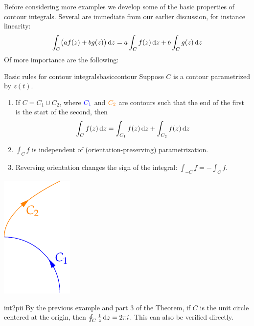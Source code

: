 Before considering more examples we develop some of the basic properties of contour integrals. Several are immediate from our earlier discussion, for instance linearity:
\[\int_C\bigl(af(z)+bg(z)\bigr)\,{\mathrm{d} z}=a\int_Cf(z)\,{\mathrm{d} z}+b\int_Cg(z)\,{\mathrm{d} z}\]
Of more importance are the following:

\begin{thm}{Basic rules for contour integrals}{basiccontour}
Suppose $C$ is a contour parametrized by $z(t)$.\par
\begin{minipage}[t]{0.75\linewidth}\vspace{-5pt}
\begin{enumerate}
  \item If $C=C_1\cup C_2$, where $\textcolor{blue}{C_1}$ and $\textcolor{orange}{C_2}$ are contours such that the end of the first is the start of the second, then
  \[\int_Cf(z)\,{\mathrm{d} z}=\int_{C_1}f(z)\,{\mathrm{d} z}+\int_{C_2}f(z)\,{\mathrm{d} z}\]
  \item $\int_Cf$ is independent of (orientation-preserving) parametrization.
  \item Reversing orientation changes the sign of the integral: $\int_{-C}f=-\int_Cf$.
\end{enumerate}
\end{minipage}\begin{minipage}[t]{0.25\linewidth}\vspace{-5pt}
\flushright\includegraphics{contours-ex5}
\end{minipage}
\end{thm}


\begin{example}{}{int2pii}
By the previous example and part 3 of the Theorem, if $C$ is the unit circle centered at the origin, then $\oint_C\frac 1z\,{\mathrm{d} z}=2\pi i$. This can also be verified  directly.
\end{example}
\goodbreak




